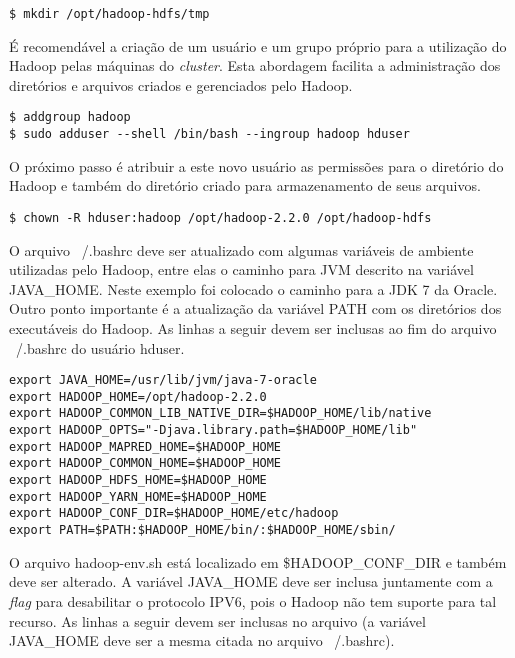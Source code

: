 \begin{apendicesenv}
\begin{lstlisting}[style=abnt,frame=single]
$ mkdir /opt/hadoop-hdfs/tmp
\end{lstlisting}

É recomendável a criação de um usuário e um grupo próprio para a utilização do Hadoop pelas máquinas do \textit{cluster}. Esta abordagem facilita a administração dos diretórios e arquivos criados e gerenciados pelo Hadoop.

\begin{lstlisting}[float, style=abnt,frame=single]
$ addgroup hadoop
$ sudo adduser --shell /bin/bash --ingroup hadoop hduser
\end{lstlisting}

O próximo passo é atribuir a este novo usuário as permissões para o diretório do Hadoop e também do diretório criado para armazenamento de seus arquivos.

\begin{lstlisting}[style=abnt,frame=single]
$ chown -R hduser:hadoop /opt/hadoop-2.2.0 /opt/hadoop-hdfs
\end{lstlisting}

O arquivo ~/.bashrc deve ser atualizado com algumas variáveis de ambiente utilizadas pelo Hadoop, entre elas o caminho para JVM descrito na variável JAVA\_HOME. Neste exemplo foi colocado o caminho para a JDK 7 da Oracle. Outro ponto importante é a atualização da variável PATH com os diretórios dos executáveis do Hadoop. As linhas a seguir devem ser inclusas ao fim do arquivo ~/.bashrc do usuário hduser.

\begin{lstlisting}[style=abnt,frame=single]
export JAVA_HOME=/usr/lib/jvm/java-7-oracle 
export HADOOP_HOME=/opt/hadoop-2.2.0 
export HADOOP_COMMON_LIB_NATIVE_DIR=$HADOOP_HOME/lib/native 
export HADOOP_OPTS="-Djava.library.path=$HADOOP_HOME/lib" 
export HADOOP_MAPRED_HOME=$HADOOP_HOME 
export HADOOP_COMMON_HOME=$HADOOP_HOME 
export HADOOP_HDFS_HOME=$HADOOP_HOME 
export HADOOP_YARN_HOME=$HADOOP_HOME 
export HADOOP_CONF_DIR=$HADOOP_HOME/etc/hadoop 
export PATH=$PATH:$HADOOP_HOME/bin/:$HADOOP_HOME/sbin/
\end{lstlisting}

O arquivo hadoop-env.sh está localizado em \$HADOOP\_CONF\_DIR e também deve ser alterado. A variável JAVA\_HOME deve ser inclusa juntamente com a \textit{flag} para desabilitar o protocolo IPV6, pois o Hadoop não tem suporte para tal recurso. As linhas a seguir devem ser inclusas no arquivo (a variável JAVA\_HOME deve ser a mesma citada no arquivo ~/.bashrc).


\end{apendicesenv}
